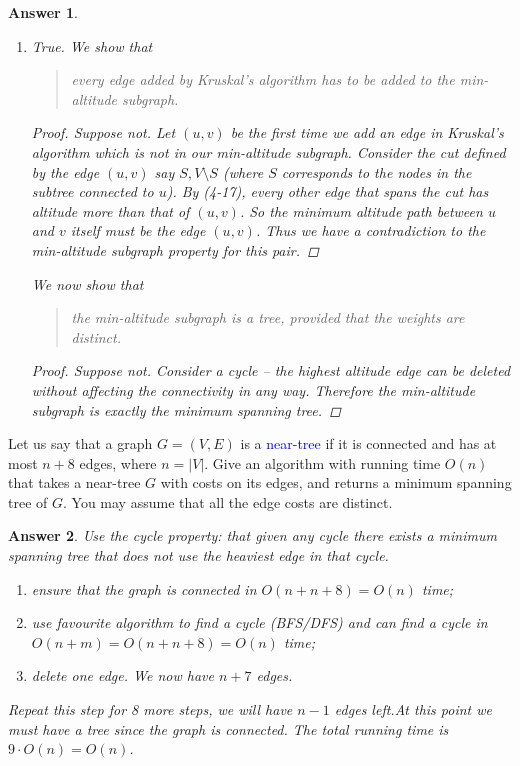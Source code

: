 \documentclass[11pt]{article}
\theoremstyle{numberplain}
\theoremstyle{nonumberplain}
\newtheorem{proof}{Proof}
\newtheorem{ans}{Answer}
\newcommand{\0}{{\mathbf{0}}}
\begin{document}
\begin{ans}
\begin{enumerate}
\begin{proof}
\end{proof}	
\item True. We show that 
\begin{quote}
every edge added by Kruskal's algorithm has to
be added to the min-altitude subgraph.
\end{quote}
\begin{proof}
Suppose not. Let $(u,v)$ be the first time we add an edge in Kruskal's algorithm which is not in our
min-altitude subgraph. Consider the cut defined by the edge $(u,v)$ say $S, V\setminus S$  (where $S$ corresponds to the nodes in the subtree connected to $u$). By (4-17), every other edge that spans the cut has altitude more than that of $(u, v)$. So the minimum altitude path between $u$ and $v$ itself must be the edge $(u, v)$. Thus we have a contradiction to the min-altitude subgraph property for this pair.
\end{proof}
We now show that 
\begin{quote}
the min-altitude subgraph is a tree, provided that the weights are distinct. 
\end{quote}
\begin{proof}
Suppose not. Consider a cycle -- the highest altitude edge can be deleted without affecting the connectivity in any
way. Therefore the min-altitude subgraph is exactly the minimum spanning tree.
\end{proof}
\end{enumerate}
\end{ans}
\newpage
\begin{ques}[HW2, 4-21] Let us say that a graph $G=(V,E)$ is a \textcolor{blue}{near-tree} if it is connected and has at most $n+8$ edges, where $n=|V|$. Give an algorithm with running time $O(n)$ that takes a near-tree $G$ with costs on its edges, and returns a minimum spanning tree of $G$. You may assume that all the edge costs are distinct.
\end{ques}
\begin{ans}
Use the cycle property: that given any cycle there exists a minimum spanning tree that
does not use the heaviest edge in that cycle.\par 
\begin{enumerate}
\item ensure that the graph is connected in $O(n+n+8) = O(n)$ time;
\item use favourite algorithm
to find a cycle (BFS/DFS) and can find a cycle in $O(n + m) = O(n + n + 8) = O(n)$ time;
\item delete one edge. We now have $n + 7$ edges. 
\end{enumerate}
Repeat this step for 8 more steps, we will have $n -1$ edges left.At this point we must have a tree since the graph is connected. The total running time is $9 \cdot O(n) = O(n)$.
\end{ans}
\end{document}

